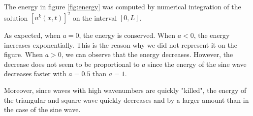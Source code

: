 \documentclass[11 pt]{article}
\begin{document}
The energy in figure \ref{fig:energy} was computed by numerical integration of the solution $\left[u^k(x, t)\right]^2$ on the interval $[0, L]$.

As expected, when $a=0$, the energy is conserved. When $a < 0$, the energy increases exponentially. This is the reason why we did not represent it on the figure. When $a > 0$, we can observe that the energy decreases. However, the decrease does not seem to be proportional to $a$ since the energy of the sine wave decreases faster with $a=0.5$ than $a=1$.

Moreover, since waves with high wavenumbers are quickly "killed", the energy of the triangular and square wave quickly decreases and by a larger amount than in the case of the sine wave.



\nocite{*}
\printbibliography
\end{document}
